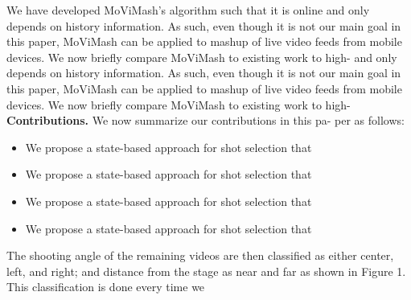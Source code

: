 \documentclass{sig-alternate}
\begin{document}
	We have developed MoViMash’s algorithm such that it is online
	and only depends on history information. As such, even though
	it is not our main goal in this paper, MoViMash can be applied to
	mashup of live video feeds from mobile devices.
	We now briefly compare MoViMash to existing work to high- 
	and only depends on history information. As such, even though
	it is not our main goal in this paper, MoViMash can be applied to
	mashup of live video feeds from mobile devices.
	We now briefly compare MoViMash to existing work to high-\\
	\textbf{Contributions.} We now summarize our contributions in this pa-
	per as follows:
	\begin{itemize}
		\item We propose a state-based approach for shot selection that
		\item We propose a state-based approach for shot selection that
		\item We propose a state-based approach for shot selection that
		\item We propose a state-based approach for shot selection that
	\end{itemize}
	
	The shooting angle of the remaining videos are then classified as
	either center, left, and right; and distance from the stage as near and
	far as shown in Figure 1. This classification is done every time we
	
\end{document}
